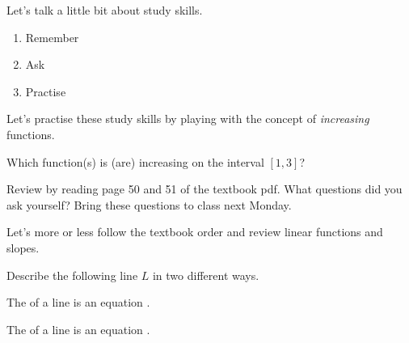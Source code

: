 \documentclass[../main.tex]{subfiles}
\begin{document}

\clearpage
Let's talk a little bit about study skills. 

\begin{mdframed}[style=simple]
  \begin{enumerate}
    \item Remember \underline{\hspace{4in}}
    \item Ask \underline{\hspace{4.5in}}
    \item Practise \underline{\hspace{4.2in}} 
  \end{enumerate}
\end{mdframed}


\begin{example}
  Let's practise these study skills by playing with the concept of \emph{increasing} functions.

  \faComments{} Which function(s) is (are) increasing on the interval \([1,3]\)?

  \begin{center}
    
    \quad
    
    \quad
    
  \end{center}
\end{example}

\begin{example}
  Review  by reading page 50 and 51 of the textbook pdf.  What questions did you ask yourself? Bring these questions to class next Monday.
\end{example}
\clearpage

Let's more or less follow the textbook order and review linear functions and slopes.

\begin{example}
  Describe the following line \(L\)  in two different ways.

  
\end{example}

The  of a line is an equation \underline{\hspace{2in}}.


The  of a line is an equation \underline{\hspace{2in}}.
\end{document}
